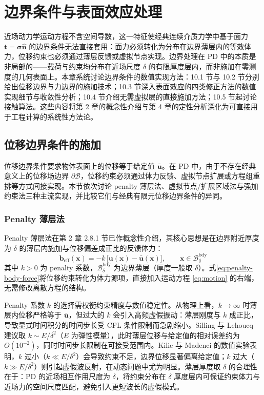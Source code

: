 \chapter{边界条件与表面效应处理}

近场动力学运动方程不含空间导数，这一特征使经典连续介质力学中基于面力 $\mathbf{t}=\boldsymbol{\sigma}\hat{\mathbf{n}}$ 的边界条件无法直接套用：面力必须转化为分布在边界薄层内的等效体力，位移约束也必须通过薄层反馈或虚拟节点实现。边界处理在 PD 中的本质是非局部的——载荷与约束均分布在近场尺度 $\delta$ 的有限厚度层内，而非施加在零测度的几何表面上。本章系统讨论边界条件的数值实现方法：10.1 节与 10.2 节分别给出位移边界与力边界的施加技术；10.3 节深入表面效应的四类修正方法的数值实现细节与收敛性分析；10.4 节介绍无需虚拟层的直接施加方法；10.5 节起讨论接触算法。这些内容将第 2 章的概念性介绍与第 4 章的定性分析深化为可直接用于工程计算的系统性方法论。

\section{位移边界条件的施加}

位移边界条件要求物体表面上的位移等于给定值 $\bar{\mathbf{u}}$。在 PD 中，由于不存在经典意义上的位移场边界 $\partial\mathcal{B}$，位移约束必须通过体力反馈、虚拟节点扩展或方程组重排等方式间接实现。本节依次讨论 penalty 薄层法、虚拟节点\slash 扩展区域法与强加约束法三种主流实现，并比较它们与经典有限元位移边界条件的异同。

\subsection{Penalty 薄层法}

Penalty 薄层法在第 2 章 2.8.1 节已作概念性介绍，其核心思想是在边界附近厚度为 $\delta$ 的薄层内施加与位移偏差成正比的反馈体力：
\begin{equation}
\mathbf{b}_{\text{eff}}(\mathbf{x}) = -k\,\bigl[\mathbf{u}(\mathbf{x})-\bar{\mathbf{u}}(\mathbf{x})\bigr], \qquad \mathbf{x}\in\mathcal{B}_{\delta}^{\text{bdy}}
\label{eq:penalty-body-force}
\end{equation}
其中 $k>0$ 为 penalty 系数，$\mathcal{B}_{\delta}^{\text{bdy}}$ 为边界薄层（厚度一般取 $\delta$）。式\eqref{eq:penalty-body-force}将位移约束转化为体力源项，直接加入运动方程 \eqref{eq:motion} 的右端，无需修改离散方程的结构。

Penalty 系数 $k$ 的选择需权衡约束精度与数值稳定性。从物理上看，$k\to\infty$ 时薄层内位移严格等于 $\bar{\mathbf{u}}$，但过大的 $k$ 会引入高频虚假振动：薄层刚度与 $k$ 成正比，导致显式时间积分的时间步长受 CFL 条件限制而急剧缩小。Silling 与 Lehoucq \cite{SillingLehoucq2010} 建议取 $k\sim E/\delta^{2}$（$E$ 为弹性模量），此时薄层位移与给定值的相对误差约为 $O(10^{-2})$，同时时间步长限制在可接受范围内。Kilic 与 Madenci \cite{KilicMadenci2010} 的数值实验表明，$k$ 过小（$k\ll E/\delta^{2}$）会导致约束不足，边界位移显著偏离给定值；$k$ 过大（$k\gg E/\delta^{2}$）则引起虚假波反射，在动态问题中尤为明显。薄层厚度取 $\delta$ 的合理性在于：PD 的近场相互作用尺度为 $\delta$，将约束分布在 $\delta$ 厚度层内可保证约束体力与近场力的空间尺度匹配，避免引入更短波长的虚假模式。

